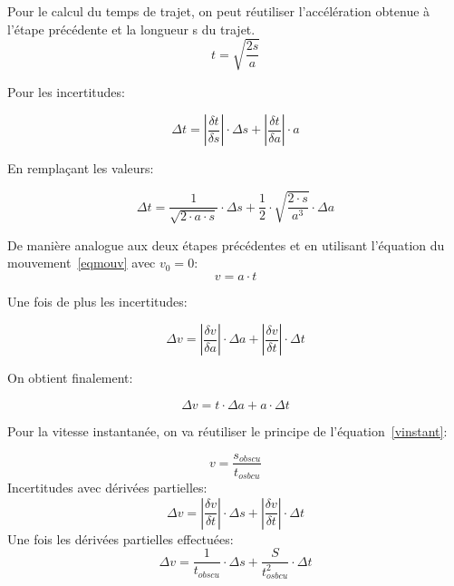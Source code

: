 Pour le calcul du temps de trajet, on peut réutiliser l'accélération obtenue à l'étape précédente et la longueur s du trajet.
\begin{equation}
    t = \sqrt{\frac{2s}{a}}
\end{equation}

Pour les incertitudes:

\begin{equation}
    \Delta t = |\frac{\delta t}{\delta s}| \cdot \Delta s + |\frac{\delta t}{\delta a}| \cdot a
\end{equation}

En remplaçant les valeurs:

\begin{equation}
    \Delta t = \frac{1}{\sqrt{2\cdot a \cdot s}}\cdot \Delta s + \frac{1}{2} \cdot \sqrt{\frac{2\cdot s}{a^3}}\cdot \Delta a
\end{equation}

De manière analogue aux deux étapes précédentes et en utilisant l'équation du mouvement~\eqref{eqmouv} avec $v_0=0$:
\begin{equation}
    v=a\cdot t
\end{equation}

Une fois de plus les incertitudes:

\begin{equation}
    \Delta v = |\frac{\delta v}{\delta a}|\cdot \Delta a + |\frac{\delta v}{\delta t}|\cdot \Delta t
\end{equation}

On obtient finalement:

\begin{equation}
    \Delta v = t \cdot \Delta a + a \cdot \Delta t
\end{equation}

Pour la vitesse instantanée, on va réutiliser le principe de l'équation~\eqref{vinstant}:

\begin{equation}
    v= \frac{s_{obscu}}{t_{osbcu}}
\end{equation}
Incertitudes avec dérivées partielles:
\begin{equation}
    \Delta v = |\frac{\delta v}{\delta t}|\cdot \Delta s + |\frac{\delta v}{\delta t}|\cdot \Delta t
\end{equation}
Une fois les dérivées partielles effectuées:
\begin{equation}
    \Delta v = \frac{1}{t_{obscu}}\cdot \Delta s + \frac{S}{t_{osbcu}^2}\cdot \Delta t
\end{equation}

